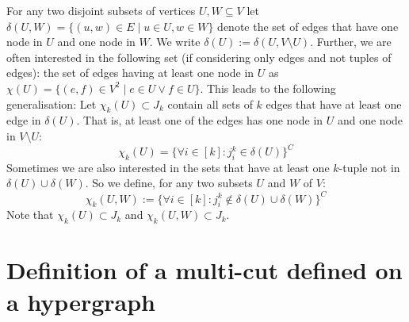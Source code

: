 For any two disjoint subsets of vertices $U,W \subseteq V$ let $\delta(U,W)= \{(u,w) \in E \mid u \in U, w \in W\}$ denote the set of edges that have one node in $U$ and one node in $W$.
We write $\delta(U):=\delta(U,V \setminus U)$.
Further, we are often interested in the following set (if considering only edges and not tuples of edges): the set of edges having at least one node in $U$ as $\chi(U)= \{(e,f) \in V^2 \mid e \in U \vee f \in U\}$. This leads to the following generalisation: Let $\chi_k(U) \subset J_k$ contain all sets of $k$ edges that have at least one edge in $\delta(U)$.
 
That is, at least one of the edges has one node in $U$ and one node in $V\setminus U$:
\[ \chi_k(U)= \{ \forall i \in [k]: j^k_i \in \delta(U) \}^C \] 
Sometimes we are also interested in the sets that have at least one $k$-tuple not in $\delta(U) \cup \delta(W)$. So we define, for any two subsets $U$ and $W$ of $V$:
\[ \chi_k(U,W):= \{ \forall i \in [k]: j^k_i \notin \delta(U) \cup \delta(W)\}^C \]
Note that $\chi_k(U) \subset J_k$ and $\chi_k(U,W) \subset J_k$.





\section{Definition of a multi-cut defined on a hypergraph}

